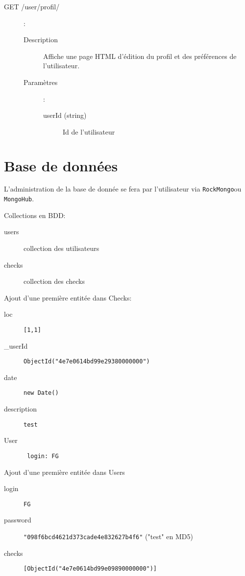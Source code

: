 \documentclass[a4paper,12pt]{report}
\begin{document}
\begin{onehalfspace}
\begin{description}
  \item[GET /user/profil/]:

    \begin{description}
      \item[Description] Affiche une page HTML d'édition du profil et des préférences de l'utilisateur.

      \item[Paramètres]:
        \begin{description}
          \item[userId (string)] Id de l'utilisateur
        \end{description}
    \end{description}

\end{description}

\chapter*{Base de données}

L'administration de la base de donnée se fera par l'utilisateur via \lstinline{RockMongo}ou \lstinline{MongoHub}.

Collections en BDD:
\begin{description}
  \item[users] collection des utilisateurs
  \item[checks] collection des checks
\end{description}

Ajout d'une première entitée dans Checks:
\begin{description}
  \item[loc] \lstinline{[1,1]}
  \item[\_userId] \lstinline{ObjectId("4e7e0614bd99e29380000000")}
  \item[date] \lstinline{new Date()}
  \item[description] \lstinline{test}
  \item[User] \lstinline{ login: FG }
\end{description}

Ajout d'une première entitée dans Users
\begin{description}
  \item[login] \lstinline{FG}
  \item[password] \lstinline{"098f6bcd4621d373cade4e832627b4f6"} ("test" en MD5)
  \item[checks] \lstinline{[ObjectId("4e7e0614bd99e09890000000")]}
\end{description}


\end{onehalfspace}
\end{document}
